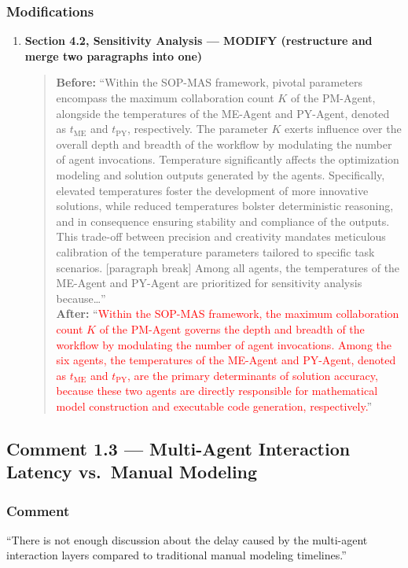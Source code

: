 \documentclass[11pt,a4paper]{article}
\begin{document}
\subsubsection{Modifications}
\begin{enumerate}
\item \textbf{Section 4.2, Sensitivity Analysis --- MODIFY (restructure and merge two paragraphs into one)}
\begin{quote}
\textbf{Before:} ``Within the SOP-MAS framework, pivotal parameters encompass the maximum collaboration count $K$ of the PM-Agent, alongside the temperatures of the ME-Agent and PY-Agent, denoted as $t_\text{ME}$ and $t_\text{PY}$, respectively. The parameter $K$ exerts influence over the overall depth and breadth of the workflow by modulating the number of agent invocations. Temperature significantly affects the optimization modeling and solution outputs generated by the agents. Specifically, elevated temperatures foster the development of more innovative solutions, while reduced temperatures bolster deterministic reasoning, and in consequence ensuring stability and compliance of the outputs. This trade-off between precision and creativity mandates meticulous calibration of the temperature parameters tailored to specific task scenarios. [paragraph break] Among all agents, the temperatures of the ME-Agent and PY-Agent are prioritized for sensitivity analysis because\dots''\\[4pt]
\textbf{After:} ``\textcolor{red}{Within the SOP-MAS framework, the maximum collaboration count $K$ of the PM-Agent governs the depth and breadth of the workflow by modulating the number of agent invocations. Among the six agents, the temperatures of the ME-Agent and PY-Agent, denoted as $t_\text{ME}$ and $t_\text{PY}$, are the primary determinants of solution accuracy, because these two agents are directly responsible for mathematical model construction and executable code generation, respectively.}''
\end{quote}
\end{enumerate}

\subsection{Comment 1.3 --- Multi-Agent Interaction Latency vs.\ Manual Modeling}

\subsubsection{Comment}
``There is not enough discussion about the delay caused by the multi-agent interaction layers compared to traditional manual modeling timelines.''
\end{document}
